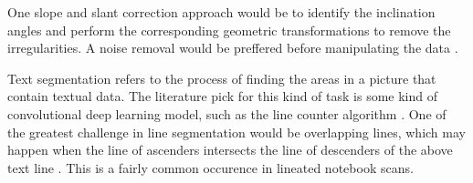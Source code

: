 One slope and slant correction approach would be to identify the inclination angles and perform the corresponding geometric transformations to remove the irregularities. A noise removal would be preffered before manipulating the data \cite{Juan}.

Text segmentation refers to the process of finding the areas in a picture that contain textual data. The literature pick for this kind of task is some kind of convolutional deep learning model, such as the line counter algorithm \cite{linecounter}. One of the greatest challenge in line segmentation would be overlapping lines, which may happen when the line of ascenders intersects the line of descenders of the above text line \cite{Juan}. This is a fairly common occurence in lineated notebook scans.